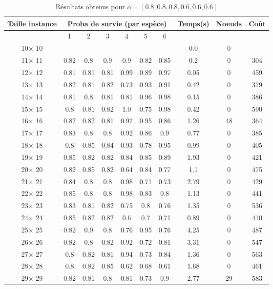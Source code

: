 \documentclass[main.tex]{subfiles}
\begin{document}
\begin{table}
    \centering
    \caption{Résultats obtenus pour $\alpha = [0.8, 0.8, 0.8, 0.6, 0.6, 0.6]$}
    \begin{tabular}{|c|c|c|c|c|c|c|c|c|c|}
	\hline
	\textbf{Taille instance} &\multicolumn{6}{c}{\textbf{Proba de survie (par espèce)}} &\textbf{Temps(s)} &\textbf{Noeuds} &\textbf{Coût}\\
	\hline
	 &1 &2 &3 &4 &5 &6 & & &\\
	\hline

10$\times$ 10 & -  & -  & -  & -  & -  & -  &0.0 &0 & - \\
11$\times$ 11 &0.82 &0.8 &0.9 &0.9 &0.82 &0.85 &0.2 &0 &304\\
12$\times$ 12 &0.81 &0.81 &0.81 &0.99 &0.89 &0.97 &0.05 &0 &459\\
13$\times$ 13 &0.82 &0.81 &0.82 &0.73 &0.93 &0.91 &0.42 &0 &379\\
14$\times$ 14 &0.81 &0.8 &0.81 &0.81 &0.96 &0.98 &0.15 &0 &386\\
15$\times$ 15 &0.8 &0.81 &0.82 &1.0 &0.75 &0.98 &0.42 &0 &590\\
16$\times$ 16 &0.82 &0.82 &0.81 &0.97 &0.95 &0.86 &1.26 &48 &364\\
17$\times$ 17 &0.83 &0.8 &0.8 &0.92 &0.86 &0.9 &0.77 &0 &385\\
18$\times$ 18 &0.8 &0.85 &0.84 &0.93 &0.78 &0.95 &0.99 &0 &405\\
19$\times$ 19 &0.85 &0.82 &0.82 &0.84 &0.85 &0.89 &1.93 &0 &421\\
20$\times$ 20 &0.82 &0.85 &0.82 &0.64 &0.84 &0.77 &1.1 &0 &475\\
21$\times$ 21 &0.84 &0.8 &0.8 &0.98 &0.71 &0.73 &2.79 &0 &429\\
22$\times$ 22 &0.85 &0.8 &0.8 &0.98 &0.83 &0.8 &1.13 &0 &441\\
23$\times$ 23 &0.83 &0.81 &0.82 &0.75 &0.8 &0.76 &1.35 &0 &536\\
24$\times$ 24 &0.85 &0.82 &0.82 &0.6 &0.7 &0.71 &0.89 &0 &410\\
25$\times$ 25 &0.82 &0.9 &0.8 &0.76 &0.95 &0.76 &4.25 &0 &487\\
26$\times$ 26 &0.82 &0.8 &0.82 &0.92 &0.72 &0.81 &3.31 &0 &547\\
27$\times$ 27 &0.8 &0.82 &0.81 &0.94 &0.73 &0.84 &1.36 &0 &563\\
28$\times$ 28 &0.8 &0.82 &0.85 &0.62 &0.68 &0.61 &1.68 &0 &461\\
29$\times$ 29 &0.82 &0.81 &0.8 &0.81 &0.73 &0.9 &2.77 &29 &583\\

\end{tabular}
\end{table}
\end{document}
